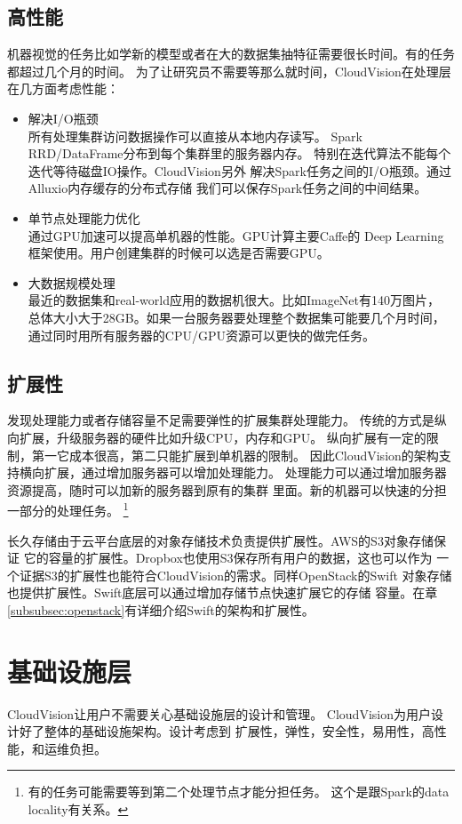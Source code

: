 \subsection{高性能}
机器视觉的任务比如学新的模型或者在大的数据集抽特征需要很长时间。有的任务都超过几个月的时间。
为了让研究员不需要等那么就时间，CloudVision在处理层在几方面考虑性能：
\begin{itemize}
  \item 解决I/O瓶颈 \\
        所有处理集群访问数据操作可以直接从本地内存读写。
        Spark RRD/DataFrame分布到每个集群里的服务器内存。
        特别在迭代算法不能每个迭代等待磁盘IO操作。CloudVision另外
        解决Spark任务之间的I/O瓶颈。通过Alluxio内存缓存的分布式存储
        我们可以保存Spark任务之间的中间结果。
  \item 单节点处理能力优化 \\
        通过GPU加速可以提高单机器的性能。GPU计算主要Caffe的
        Deep Learning框架使用。用户创建集群的时候可以选是否需要GPU。
  \item 大数据规模处理 \\
        最近的数据集和real-world应用的数据机很大。比如ImageNet有140万图片，
        总体大小大于28GB。如果一台服务器要处理整个数据集可能要几个月时间，
        通过同时用所有服务器的CPU/GPU资源可以更快的做完任务。
\end{itemize}

\subsection{扩展性}
发现处理能力或者存储容量不足需要弹性的扩展集群处理能力。
传统的方式是纵向扩展，升级服务器的硬件比如升级CPU，内存和GPU。
纵向扩展有一定的限制，第一它成本很高，第二只能扩展到单机器的限制。
因此CloudVision的架构支持横向扩展，通过增加服务器可以增加处理能力。
处理能力可以通过增加服务器资源提高，随时可以加新的服务器到原有的集群
里面。新的机器可以快速的分担一部分的处理任务。
\footnote{有的任务可能需要等到第二个处理节点才能分担任务。
这个是跟Spark的data locality有关系。}

长久存储由于云平台底层的对象存储技术负责提供扩展性。AWS的S3对象存储保证
它的容量的扩展性。Dropbox也使用S3保存所有用户的数据，这也可以作为
一个证据S3的扩展性也能符合CloudVision的需求。同样OpenStack的Swift
对象存储也提供扩展性。Swift底层可以通过增加存储节点快速扩展它的存储
容量。在章\ref{subsubsec:openstack}有详细介绍Swift的架构和扩展性。

\section{基础设施层}
\label{sec:arch_infra}
CloudVision让用户不需要关心基础设施层的设计和管理。
CloudVision为用户设计好了整体的基础设施架构。设计考虑到
扩展性，弹性，安全性，易用性，高性能，和运维负担。


